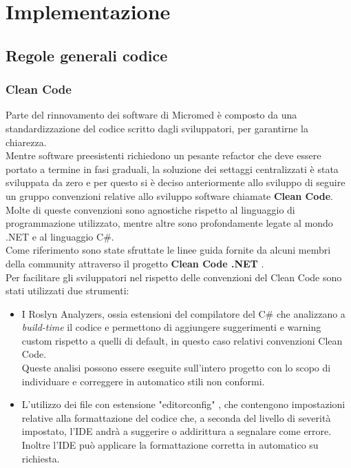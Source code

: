 \documentclass[\main/tesi.tex]{subfiles}
\begin{document}
\chapter{Implementazione}

\section{Regole generali codice}

\subsection{Clean Code}

Parte del rinnovamento dei software di Micromed è composto da una standardizzazione del codice scritto dagli sviluppatori, per garantirne la chiarezza.\\
Mentre software preesistenti richiedono un pesante refactor che deve essere portato a termine in fasi graduali, la soluzione dei settaggi centralizzati è stata sviluppata da zero e per questo si è deciso anteriormente allo sviluppo di seguire un gruppo convenzioni relative allo sviluppo software chiamate \textbf{Clean Code}.\\
Molte di queste convenzioni sono agnostiche rispetto al linguaggio di programmazione utilizzato, mentre altre sono profondamente legate al mondo .NET e al linguaggio C\#.\\
Come riferimento sono state sfruttate le linee guida fornite da alcuni membri della community attraverso il progetto \textbf{Clean Code .NET} \cite{cleancode}.\\
Per facilitare gli sviluppatori nel rispetto delle convenzioni del Clean Code sono stati utilizzati due strumenti:
\begin{itemize}
    \item I Roslyn Analyzers, ossia estensioni del compilatore del C\# che analizzano a \textit{build-time} il codice e permettono di aggiungere suggerimenti e warning custom rispetto a quelli di default, in questo caso relativi convenzioni Clean Code.\\Queste analisi possono essere eseguite sull'intero progetto con lo scopo di individuare e correggere in automatico stili non conformi.
    \item L'utilizzo dei file con estensione "editorconfig" \cite{editorconfig}, che contengono impostazioni relative alla formattazione del codice che, a seconda del livello di severità impostato, l'IDE andrà a suggerire o addirittura a segnalare come errore.\\Inoltre l'IDE può applicare la formattazione corretta in automatico su richiesta.
\end{itemize}
\end{document}

